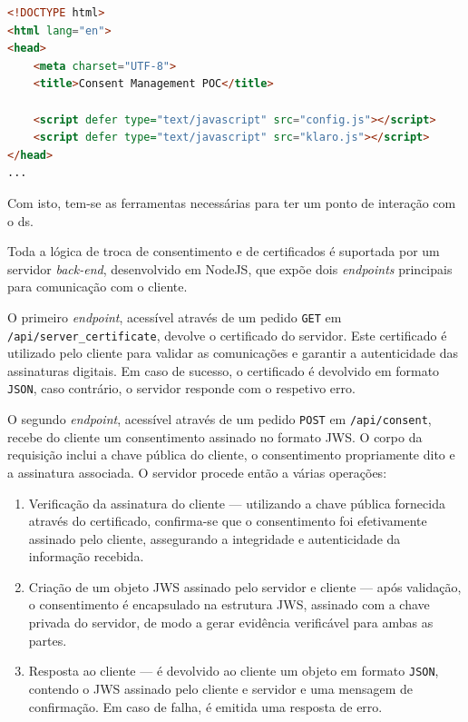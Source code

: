 \begin{lstlisting}[language=HTML, caption={Integração do KlaroJS com a configuração local}, label={lst:klaro-integration}]
<!DOCTYPE html>
<html lang="en">
<head>
    <meta charset="UTF-8">
    <title>Consent Management POC</title>

    <script defer type="text/javascript" src="config.js"></script>
    <script defer type="text/javascript" src="klaro.js"></script>
</head>
...
\end{lstlisting}

Com isto, tem-se as ferramentas necessárias para ter um ponto de interação com o \acrshort{ds}.

Toda a lógica de troca de consentimento e de certificados é suportada por um servidor \textit{back-end}, desenvolvido em NodeJS, que expõe dois \textit{endpoints} principais para comunicação com o cliente.

O primeiro \textit{endpoint}, acessível através de um pedido \texttt{GET} em \texttt{/api/server\_certificate}, devolve o certificado do servidor. Este certificado é utilizado pelo cliente para validar as comunicações e garantir a autenticidade das assinaturas digitais. Em caso de sucesso, o certificado é devolvido em formato \texttt{JSON}, caso contrário, o servidor responde com o respetivo erro.

O segundo \textit{endpoint}, acessível através de um pedido \texttt{POST} em \texttt{/api/consent}, recebe do cliente um consentimento assinado no formato JWS. O corpo da requisição inclui a chave pública do cliente, o consentimento propriamente dito e a assinatura associada. O servidor procede então a várias operações:

\begin{enumerate}
    \item Verificação da assinatura do cliente — utilizando a chave pública fornecida através do certificado, confirma-se que o consentimento foi efetivamente assinado pelo cliente, assegurando a integridade e autenticidade da informação recebida.
    \item Criação de um objeto JWS assinado pelo servidor e cliente — após validação, o consentimento é encapsulado na estrutura JWS, assinado com a chave privada do servidor, de modo a gerar evidência verificável para ambas as partes.
    \item Resposta ao cliente — é devolvido ao cliente um objeto em formato \texttt{JSON}, contendo o JWS assinado pelo cliente e servidor e uma mensagem de confirmação. Em caso de falha, é emitida uma resposta de erro.
\end{enumerate}

